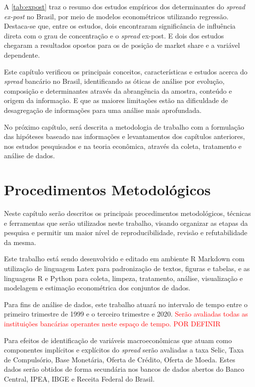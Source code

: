\documentclass[12pt,openright,oneside,a4paper,chapter=TITLE,section=TITLE,subsection=TITLE,english,french,spanish,portugues,sumario=tradicional]{abntex2}
\begin{document}
A \autoref{tab:expost} traz o resumo dos estudos empíricos dos determinantes do
\emph{spread ex-post} no Brasil, por meio de modelos econométricos utilizando
regressão. Destaca-se que, entre os estudos, dois encontraram significância de
influência direta com o grau de concentração e o \emph{spread} ex-post. E dois dos
estudos chegaram a resultados opostos para os de posição de market share e a
variável dependente.

Este capítulo verificou os principais conceitos, características e estudos
acerca do \emph{spread} bancário no Brasil, identificando as óticas de análise por
evolução, composição e determinantes através da abrangência da amostra,
conteúdo e origem da informação. E que as maiores limitações estão na
dificuldade de desagregação de informações para uma análise mais aprofundada.

No próximo capítulo, será descrita a metodologia de trabalho com a formulação
das hipóteses baseado nas informações e levantamentos dos capítulos anteriores,
nos estudos pesquisados e na teoria econômica, através da coleta, tratamento e
análise de dados.

\textual
\pagestyle{simple}

\chapter{Procedimentos Metodológicos}

Neste capítulo serão descritos os principais procedimentos metodológicos,
técnicas e ferramentas que serão utilizados neste trabalho, visando organizar as etapas da pesquisa e permitir um maior nível de reproducibilidade, revisão e
refutabilidade da mesma.

Este trabalho está sendo desenvolvido e editado em ambiente R Markdown com utilização de linguagem Latex para padronização de textos, figuras e tabelas, e as linguagens R e Python para coleta, limpeza, tratamento, análise, visualização e modelagem e estimação econométrica dos conjuntos de dados.

Para fins de análise de dados, este trabalho atuará no intervalo de tempo entre o primeiro trimestre de 1999 e o terceiro trimestre e 2020. \textcolor{red} {Serão avaliadas todas as instituições bancárias operantes neste espaço de tempo. POR DEFINIR}

Para efeitos de identificação de variáveis macroeconômicas que atuam como componentes implícitos e explícitos do \emph{spread} serão avaliadas a taxa Selic, Taxa de Compulsório, Base Monetária, Oferta de Crédito, Oferta de Moeda. Estes dados serão obtidos de forma secundária nos bancos de dados abertos do Banco Central, IPEA, IBGE e Receita Federal do Brasil.
\end{document}
